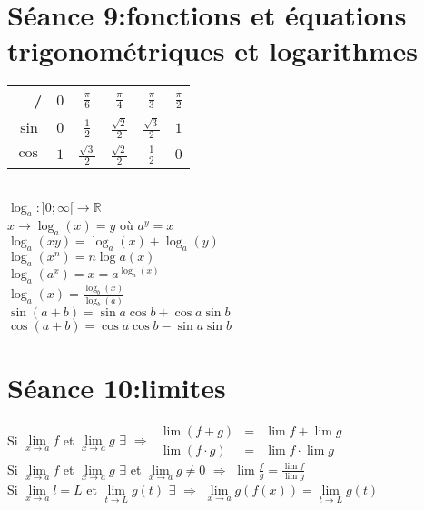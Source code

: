 \documentclass[12pt]{article}
\begin{document}
\section*{S\'eance 9:fonctions et \'equations trigonom\'etriques et logarithmes}
\begin{tabular}{r|ccccc}
	/ & $0$ & $\frac{\pi}{6}$ & $\frac{\pi}{4}$ & $\frac{\pi}{3}$ & $\frac{\pi}{2}$ \\
	\hline
	$\sin$ & $0$ & $\frac{1}{2}$ & $\frac{\sqrt{2}}{2}$ & $\frac{\sqrt{3}}{2}$ & $1$ \\
	$\cos$ & $1$ & $\frac{\sqrt{3}}{2}$ & $\frac{\sqrt{2}}{2}$ & $\frac{1}{2}$ & $0$\\
\end{tabular} \\ \newline
\indent$\log_{a} : ]0; \infty[ \rightarrow \mathbb{R}$ \\
\indent$x \rightarrow \log_{a}(x) = y$ o\`u $a^{y}=x$ \\ \newline
$\log_{a}(xy) = \log_{a}(x) + \log_{a}(y)$ \\
$\log_{a}(x^{n}) = n\log{a}(x)$ \\
$\log_{a}(a^{x}) = x = a^{\log_{a}(x)}$ \\
$\log_{a}(x) = \frac{\log_{b}(x)}{\log_{b}(a)}$ \\ \newline
$\sin{(a+b)} = \sin{a}\cos{b}+\cos{a}\sin{b}$ \\ 
$\cos{(a+b)} = \cos{a}\cos{b}-\sin{a}\sin{b}$
\section*{S\'eance 10:limites}
Si $\underset{x\to a}\lim f$ et $\underset{x\to a}\lim g$  $\exists$ $\Rightarrow$ 
\(
\begin{array}{lcl}
    \lim (f+g) & = & \lim f + \lim g \\
    \lim (f \cdot g) & = &  \lim f \cdot \lim g 
\end{array}\) \\ \newline
\indent Si $\underset{x\to a}\lim f$ et $\underset{x\to a}\lim g$  $\exists$ et $\underset{x\to a}\lim g \not= 0$ $\Rightarrow$ $\lim{\frac{f}{g}} = \frac{\lim{f}}{\lim{g}}$ \\ \newline
\indent Si $\underset{x\to a}\lim l = L$ et $\underset{t\to L}\lim g(t)$  $\exists$ $\Rightarrow$ $\underset{x\to a}\lim g(f(x)) = \underset{t\to L}\lim  g(t)$ \\
\end{document}
